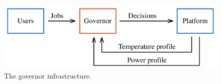\begin{figure}
  \centering
  \includegraphics[width=1.0\columnwidth]{include/assets/figures/governor.pdf}
  \caption{The governor infrastructure.}
\end{figure}
